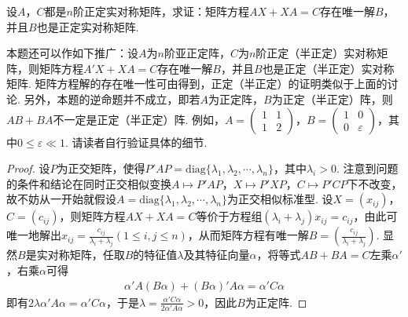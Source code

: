 \documentclass[../../main.tex]{subfiles}
\begin{document}
\begin{proposition}\label{proposition:例9.69}
设\(A\)，\(C\)都是\(n\)阶正定实对称矩阵，求证：矩阵方程\(AX + XA = C\)存在唯一解\(B\)，并且\(B\)也是正定实对称矩阵.
\end{proposition}
\begin{remark}
本题还可以作如下推广：设\(A\)为\(n\)阶亚正定阵，\(C\)为\(n\)阶正定（半正定）实对称矩阵，则矩阵方程\(A'X + XA = C\)存在唯一解\(B\)，并且\(B\)也是正定（半正定）实对称矩阵. 矩阵方程解的存在唯一性可由得到，正定（半正定）的证明类似于上面的讨论. 另外，本题的逆命题并不成立，即若\(A\)为正定阵，\(B\)为正定（半正定）阵，则\(AB + BA\)不一定是正定（半正定）阵. 例如，\(A=\begin{pmatrix}1&1\\1&2\end{pmatrix}\)，\(B=\begin{pmatrix}1&0\\0&\varepsilon\end{pmatrix}\)，其中\(0\leqslant \varepsilon\ll1\). 请读者自行验证具体的细节.
\end{remark}
\begin{proof}
设\(P\)为正交矩阵，使得\(P'AP=\mathrm{diag}\{\lambda_1,\lambda_2,\cdots,\lambda_n\}\)，其中\(\lambda_i > 0\). 注意到问题的条件和结论在同时正交相似变换\(A\mapsto P'AP\)，\(X\mapsto P'XP\)，\(C\mapsto P'CP\)下不改变，故不妨从一开始就假设\(A = \mathrm{diag}\{\lambda_1,\lambda_2,\cdots,\lambda_n\}\)为正交相似标准型. 设\(X=(x_{ij})\)，\(C=(c_{ij})\)，则矩阵方程\(AX + XA = C\)等价于方程组\((\lambda_i + \lambda_j)x_{ij}=c_{ij}\)，由此可唯一地解出\(x_{ij}=\frac{c_{ij}}{\lambda_i + \lambda_j}(1\leqslant  i,j\leqslant  n)\)，从而矩阵方程有唯一解\(B = (\frac{c_{ij}}{\lambda_i + \lambda_j})\). 显然\(B\)是实对称矩阵，任取\(B\)的特征值\(\lambda\)及其特征向量\(\alpha\)，将等式\(AB + BA = C\)左乘\(\alpha'\)，右乘\(\alpha\)可得
\begin{align*}
\alpha'A(B\alpha)+(B\alpha)'A\alpha=\alpha'C\alpha
\end{align*}
即有\(2\lambda\alpha'A\alpha=\alpha'C\alpha\)，于是\(\lambda=\frac{\alpha'C\alpha}{2\alpha'A\alpha}>0\)，因此\(B\)为正定阵.

\end{proof}
\end{document}
